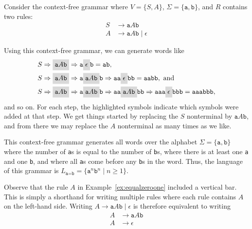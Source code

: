 \begin{example}\label{ex:equalzeroone}
Consider the context-free grammar where $V = \{S, A\}$, $\Sigma = \{\texttt{a}, \texttt{b}\}$, and $R$ contains two rules:
\begin{align*}
S	&\rightarrow \texttt{a}A\texttt{b} \\
A	&\rightarrow \texttt{a}A\texttt{b} \mid \epsilon
\end{align*}

Using this context-free grammar, we can generate words like
\begin{align*}
&S \Rightarrow \highlightmath{\texttt{a}A\texttt{b}} \Rightarrow \texttt{a}\highlightmath{\epsilon}\texttt{b} = \texttt{ab}, \\
&S \Rightarrow \highlightmath{\texttt{a}A\texttt{b}} \Rightarrow \texttt{a}\highlightmath{\texttt{a}A\texttt{b}}\texttt{b} \Rightarrow \texttt{aa}\highlightmath{\epsilon}\texttt{bb} = \texttt{aabb}, \text{ and} \\
&S \Rightarrow \highlightmath{\texttt{a}A\texttt{b}} \Rightarrow \texttt{a}\highlightmath{\texttt{a}A\texttt{b}}\texttt{b} \Rightarrow \texttt{aa}\highlightmath{\texttt{a}A\texttt{b}}\texttt{bb} \Rightarrow \texttt{aaa}\highlightmath{\epsilon}\texttt{bbb} = \texttt{aaabbb},
\end{align*}
and so on. For each step, the highlighted symbols indicate which symbols were added at that step. We get things started by replacing the $S$ nonterminal by $\texttt{a}A\texttt{b}$, and from there we may replace the $A$ nonterminal as many times as we like.

This context-free grammar generates all words over the alphabet $\Sigma = \{\texttt{a}, \texttt{b}\}$ where the number of \texttt{a}s is equal to the number of \texttt{b}s, where there is at least one \texttt{a} and one \texttt{b}, and where all \texttt{a}s come before any \texttt{b}s in the word. Thus, the language of this grammar is $L_{\texttt{a}=\texttt{b}} = \{\texttt{a}^{n}\texttt{b}^{n} \mid n \geq 1\}$.
\end{example}

Observe that the rule $A$ in Example~\ref{ex:equalzeroone} included a vertical bar. This is simply a shorthand for writing multiple rules where each rule contains $A$ on the left-hand side. Writing $A \rightarrow \texttt{a}A\texttt{b} \mid \epsilon$ is therefore equivalent to writing
\begin{align*}
A 	&\rightarrow \texttt{a}A\texttt{b} \\
A 	&\rightarrow \epsilon
\end{align*}

